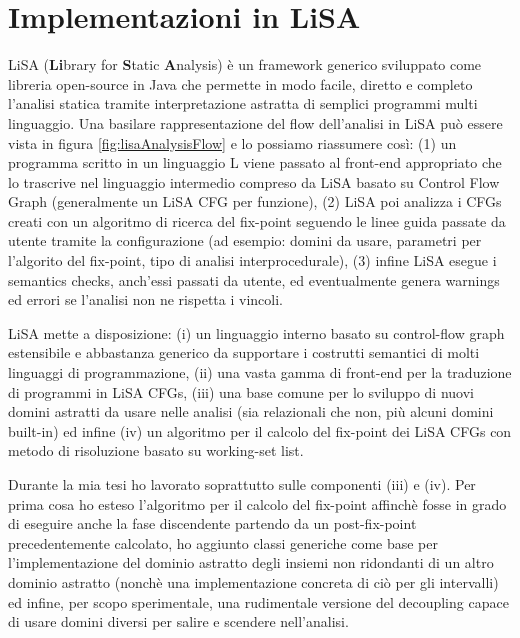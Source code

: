 \chapter{Implementazioni in LiSA}\label{chapter:lisa}



LiSA (\textbf{Li}brary for \textbf{S}tatic \textbf{A}nalysis) è un framework generico sviluppato come libreria open-source in Java che permette in modo facile, diretto e completo l'analisi statica tramite interpretazione astratta di semplici programmi multi linguaggio. Una basilare rappresentazione del flow dell'analisi in LiSA può essere vista in figura \ref{fig:lisaAnalysisFlow} e lo possiamo riassumere così: (1) un programma scritto in un linguaggio L viene passato al front-end appropriato che lo trascrive nel linguaggio intermedio compreso da LiSA basato su Control Flow Graph (generalmente un LiSA CFG per funzione), (2) LiSA poi analizza i CFGs creati con un algoritmo di ricerca del fix-point seguendo le linee guida passate da utente tramite la configurazione (ad esempio: domini da usare, parametri per l'algorito del fix-point, tipo di analisi interprocedurale), (3) infine LiSA esegue i semantics checks, anch'essi passati da utente, ed eventualmente genera warnings ed errori se l'analisi non ne rispetta i vincoli. 

LiSA mette a disposizione: (i) un linguaggio interno basato su control-flow graph estensibile e abbastanza generico da supportare i costrutti semantici di molti linguaggi di programmazione, (ii) una vasta gamma di front-end per la traduzione di programmi in LiSA CFGs, (iii) una base comune per lo sviluppo di nuovi domini astratti da usare nelle analisi (sia relazionali che non, più alcuni domini built-in) ed infine (iv) un algoritmo per il calcolo del fix-point dei LiSA CFGs con metodo di risoluzione basato su working-set list.

Durante la mia tesi ho lavorato soprattutto sulle componenti (iii) e (iv). Per prima cosa ho esteso l'algoritmo per il calcolo del fix-point affinchè fosse in grado di eseguire anche la fase discendente partendo da un post-fix-point precedentemente calcolato, ho aggiunto classi generiche come base per l'implementazione del dominio astratto degli insiemi non ridondanti di un altro dominio astratto (nonchè una implementazione concreta di ciò per gli intervalli) ed infine, per scopo sperimentale, una rudimentale versione del decoupling capace di usare domini diversi per salire e scendere nell'analisi.

